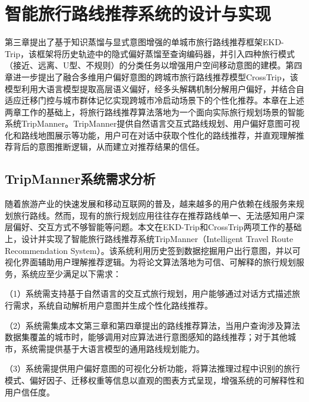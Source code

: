 
\chapter{智能旅行路线推荐系统的设计与实现}
\label{chap:system}

第三章提出了基于知识蒸馏与显式意图增强的单城市旅行路线推荐框架EKD-Trip，该框架将历史轨迹中的隐式偏好蒸馏至查询编码器，并引入四种旅行模式（接近、远离、U型、不规则）的分类任务以增强用户空间移动意图的建模。第四章进一步提出了融合多维用户偏好意图的跨城市旅行路线推荐模型CrossTrip，该模型利用大语言模型提取高层语义偏好，经多头解耦机制分解用户偏好，并结合自适应迁移门控与城市群体记忆实现跨城市冷启动场景下的个性化推荐。本章在上述两章工作的基础上，将旅行路线推荐算法落地为一个面向实际旅行规划场景的智能系统TripManner。TripManner提供自然语言交互式路线规划、用户偏好意图可视化和路线地图展示等功能，用户可在对话中获取个性化的路线推荐，并直观理解推荐背后的意图推断逻辑，从而建立对推荐结果的信任。

\section{TripManner系统需求分析}
\label{sec:ch5_requirement}

随着旅游产业的快速发展和移动互联网的普及，越来越多的用户依赖在线服务来规划旅行路线。然而，现有的旅行规划应用往往存在推荐路线单一、无法感知用户深层偏好、交互方式不够智能等问题。本文在EKD-Trip和CrossTrip两项工作的基础上，设计并实现了智能旅行路线推荐系统TripManner（Intelligent Travel Route Recommendation System）。该系统利用历史签到数据挖掘用户出行意图，并以可视化界面辅助用户理解推荐逻辑。为将论文算法落地为可信、可解释的旅行规划服务，系统应至少满足以下需求：

（1）系统需支持基于自然语言的交互式旅行规划，用户能够通过对话方式描述旅行需求，系统自动解析用户意图并生成个性化路线推荐。

（2）系统需集成本文第三章和第四章提出的路线推荐算法，当用户查询涉及算法数据集覆盖的城市时，能够调用对应算法进行意图感知的路线推荐；对于其他城市，系统需提供基于大语言模型的通用路线规划能力。

（3）系统需提供用户偏好意图的可视化分析功能，将算法推理过程中识别的旅行模式、偏好因子、迁移权重等信息以直观的图表方式呈现，增强系统的可解释性和用户信任度。

